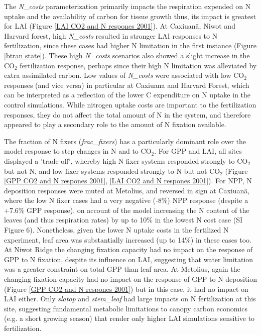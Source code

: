 \documentclass[draft,linenumbers]{agujournal}
\begin{document}
The \emph{N\_costs} parameterization primarily impacts the respiration expended on N uptake and the availability of carbon for tissue growth thus, its impact is greatest for LAI (Figure \ref{LAI CO2 and N respones 2001}). At Caxiuan\~a, Niwot and Harvard forest, high  \emph{N\_costs} resulted in stronger LAI responses to N fertilization, since these cases had higher N limitation in the first instance (Figure \ref{btran state}).  These high \emph{N\_costs} scenarios also showed a slight increase in the CO$_{2}$ fertilization response, perhaps since their high N limitation was alleviated by extra assimilated carbon.   Low values of \emph{N\_costs} were associated with low CO$_{2}$ responses (and vice versa) in particular at Caxiuana and Harvard Forest, which can be interpreted as a reflection of the lower C expenditure on N uptake in the control simulations.  While nitrogen uptake costs are important to the fertilization responses, they do not affect the total amount of N in the system, and therefore appeared to play a secondary role to the amount of N fixation available.

The fraction of N fixers (\emph{frac\_fixers}) has a particularly dominant role over the model response to step changes in N and to CO$_{2}$. For GPP and LAI, all sites displayed a 'trade-off', whereby high N fixer systems responded strongly to CO$_{2}$ but not N, and low fixer systems responded strongly to N but not CO$_{2}$ (Figure \ref{GPP CO2 and N respones 2001}, \ref{LAI CO2 and N respones 2001}).  For NPP, N deposition responses were muted at Metolius, and reversed in sign at Caxiuan\~a, where the low N fixer cases had a very negative (-8\%) NPP response (despite a +7.6\% GPP response), on account of the model increasing the N content of the leaves (and thus respiration rates) by up to 10\% in the lowest N cost case (SI Figure 6). Nonetheless, given the lower N uptake costs in the fertilized N experiment, leaf area was substantially increased (up to 14\%) in these cases too.  At Niwot Ridge the changing fixation capacity had no impact on the response of GPP to N fixation, despite its influence on LAI, suggesting that water limitation was a greater constraint on total GPP than leaf area.  At Metolius, again the changing fixation capacity had no impact on the response of GPP to N deposition (Figure \ref{GPP CO2 and N respones 2001}) but in this case, it had no impact on LAI either. Only \emph{slatop} and \emph{stem\_leaf} had large impacts on N fertilization at this site, suggesting fundamental metabolic limitations to canopy carbon economics (e.g. a short growing season) that render only higher LAI simulations sensitive to fertilization. 
\end{document}
